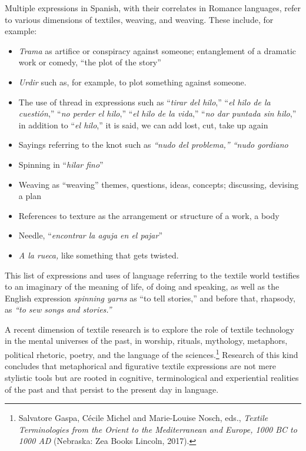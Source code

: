 \documentclass{tufte-handout}
\begin{document}
Multiple expressions in Spanish, with their correlates in Romance
languages, refer to various dimensions of textiles, weaving, and
weaving. These include, for example:

\begin{itemize}
\item
  \emph{Trama} as artifice or conspiracy against someone; entanglement
  of a dramatic work or comedy, ``the plot of the story''
\item
  \emph{Urdir} such as, for example, to plot something against someone.
\item
  The use of thread in expressions such as ``\emph{tirar del hilo},''
  ``\emph{el hilo de la cuestión},'' ``\emph{no perder el hilo},''
  ``\emph{el hilo de la vida},'' ``\emph{no dar puntada sin hilo},'' in
  addition to ``\emph{el hilo},'' it is said, we can add lost, cut, take
  up again
\item
  Sayings referring to the knot such as \emph{``nudo del problema,''
  ``nudo gordiano}
\item
  Spinning in ``\emph{hilar fino}''
\item
  Weaving as ``weaving'' themes, questions, ideas, concepts; discussing,
  devising a plan
\item
  References to texture as the arrangement or structure of a work, a
  body
\item
  Needle, ``\emph{encontrar la aguja en el pajar}''
\item
  \emph{A la rueca,} like something that gets twisted.
\end{itemize}

This list of expressions and uses of language referring to the textile
world testifies to an imaginary of the meaning of life, of doing and
speaking, as well as the English expression \emph{spinning yarns} as
``to tell stories,'' and before that, rhapsody, as \emph{``to sew songs
and stories.''}

A recent dimension of textile research is to explore the role of textile
technology in the mental universes of the past, in worship, rituals,
mythology, metaphors, political rhetoric, poetry, and the language of
the sciences.\footnote{Salvatore Gaspa, Cécile Michel and Marie-Louise
  Nosch, eds., \emph{Textile Terminologies from the Orient to the
  Mediterranean and Europe, 1000 BC to 1000 AD} (Nebraska: Zea Books
  Lincoln, 2017).} Research of this kind concludes that metaphorical and
figurative textile expressions are not mere stylistic tools but are
rooted in cognitive, terminological and experiential realities of the
past and that persist to the present day in language.
\end{document}
